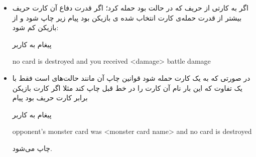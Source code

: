 \documentclass[]{article}
\begin{document}
\begin{itemize}
	\item
اگر به کارتی از حریف که در حالت  بود حمله کرد؛ اگر قدرت دفاع آن کارت 
حریف بیشتر از قدرت حمله‌ی کارت انتخاب شده ی بازیکن بود پیام زیر چاپ شود و 
از 
 بازیکن کم شود:
	\begin{mybox}[colback=yellow]{پیغام به کاربر}
	\begin{latin}	
	    no card is destroyed and you received <damage> battle damage	
	\end{latin}
	\end{mybox}

	\item
	در صورتی که به یک کارت  حمله شود قوانین چاپ آن مانند حالت‌های 
	 است فقط با یک تفاوت که این بار نام آن کارت را در خط قبل چاپ کند 
	مثلا 
	اگر  کارت بازیکن برابر  کارت حریف بود پیام
	\begin{mybox}[colback=yellow]{پیغام به کاربر}
		\begin{latin}	
			opponent’s monster card was <monster card name> and no card is 
			destroyed
		\end{latin}
	\end{mybox}
	چاپ می‌شود.
\end{itemize}
\end{document}
